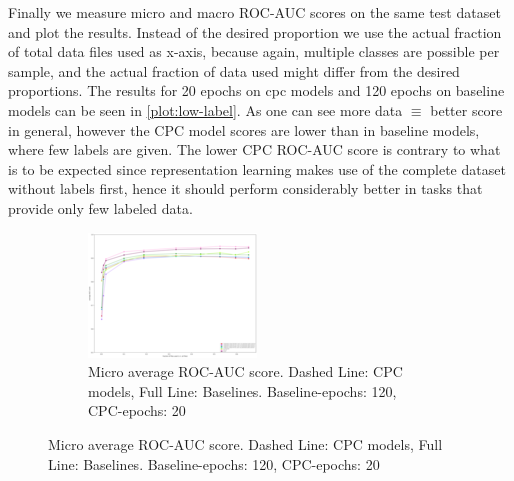 Finally we measure micro and macro ROC-AUC scores on the same test dataset and plot the results. Instead of the desired proportion we use the actual fraction of total data files used as x-axis, because again, multiple classes are possible per sample, and the actual fraction of data used might differ from the desired proportions. The results for 20 epochs on cpc models and 120 epochs on baseline models can be seen in \autoref{plot:low-label}. As one can see more data $\equiv$ better score in general, however the CPC model scores are lower than in baseline models, where few labels are given. The lower CPC ROC-AUC score is contrary to what is to be expected since representation learning makes use of the complete dataset without labels first, hence it should perform considerably better in tasks that provide only few labeled data.
\begin{figure}
	\caption{Test scores for different models trained with a fraction of data labels} %
	\begin{subfigure}[t]{0.99\textwidth}\centering
		\includegraphics[width=1\linewidth]{bilder/2lowlabel-micro-20.png}%
		\caption{Micro average ROC-AUC score. Dashed Line: CPC models, Full Line: Baselines. Baseline-epochs: 120, CPC-epochs: 20}
		\label{fig:low-label-micro}	
	\end{subfigure}


\end{figure}
